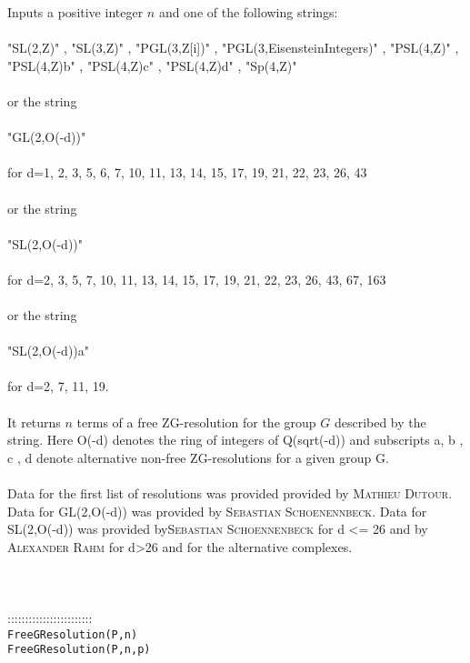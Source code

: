 \documentclass[a4paper,11pt]{report}
\begin{document}
{ Inputs a positive integer $n$ and one of the following strings: \\
\\
 "SL(2,Z)" , "SL(3,Z)" , "PGL(3,Z[i])" ,
"PGL(3,Eisenstein{\textunderscore}Integers)" , "PSL(4,Z)" ,
"PSL(4,Z){\textunderscore}b" , "PSL(4,Z){\textunderscore}c" ,
"PSL(4,Z){\textunderscore}d" , "Sp(4,Z)" \\
\\
 or the string \\
\\
 "GL(2,O(-d))" \\
\\
 for d=1, 2, 3, 5, 6, 7, 10, 11, 13, 14, 15, 17, 19, 21, 22, 23, 26, 43 \\
\\
 or the string \\
\\
 "SL(2,O(-d))" \\
\\
 for d=2, 3, 5, 7, 10, 11, 13, 14, 15, 17, 19, 21, 22, 23, 26, 43, 67, 163 \\
\\
 or the string \\
\\
 "SL(2,O(-d)){\textunderscore}a" \\
\\
 for d=2, 7, 11, 19. \\
\\
 It returns $n$ terms of a free ZG-resolution for the group $G$ described by the string. Here O(-d) denotes the ring of integers of
Q(sqrt(-d)) and subscripts {\textunderscore}a, {\textunderscore}b ,
{\textunderscore}c , {\textunderscore}d denote alternative non-free
ZG-resolutions for a given group G.\\
\\
 Data for the first list of resolutions was provided provided by \textsc{Mathieu Dutour}. Data for GL(2,O(-d)) was provided by \textsc{Sebastian Schoenennbeck}. Data for SL(2,O(-d)) was provided by\textsc{Sebastian Schoennenbeck} for d {\textless}= 26 and by \textsc{Alexander Rahm} for d{\textgreater}26 and for the alternative complexes.\\
 \\
 \\
 \\
 ::::::::::::::::::::::::\\
 \texttt{FreeGResolution(P,n)}\\
 \texttt{FreeGResolution(P,n,p)}\\
 

}
\end{document}
